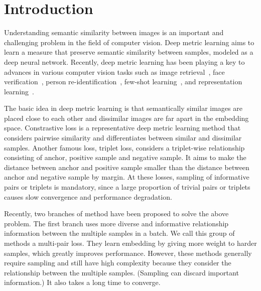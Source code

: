 \documentclass[10pt,twocolumn,letterpaper]{article}
\newcommand{\suha}[1]{{\color{brown}{#1}}}
\begin{document}
\section{Introduction}
\label{sec:intro}
Understanding semantic similarity between images is an important and challenging problem in the field of computer vision. Deep metric learning aims to learn a measure that preserve semantic similarity between samples, modeled as a deep neural network. \suha{(talk about deep metric learning at the end of this paragraph or move this sentence to the enxt paragraph---deep metric learning = deep neural net for feature extraction learned by metric learning losses, so losses are important.)}
Recently, deep metric learning has been playing a key to advances in various computer vision tasks such as image retrieval~\cite{movshovitz2017no, songCVPR16, Sohn_nips2016, kim2019deep}, face verification~\cite{Schroff2015, liu2017sphereface}, person re-identification~\cite{Chen_2017_CVPR,xiao2017joint}, few-shot learning~\cite{snell2017prototypical, sung2018learning, Qiao_2019_ICCV}, and representation learning~\cite{kim2019deep,Wang2015}. \suha{(add more examples of few/zero-shot learning using metric learning if possible. any iccv 2019 papers to be cited? \eg, patch-representation learning using soft-margin triplet loss.)}





The basic idea in deep metric learning is that semantically similar images are placed close to each other and dissimilar images are far apart in the embedding space.
Constrastive loss is a representative deep metric learning method that considers pairwise similarity and differentiates between similar and dissimilar samples. Another famous loss, triplet loss, considers a triplet-wise relationship consisting of anchor, positive sample and negative sample. It aims to make the distance between anchor and positive sample smaller than the distance between anchor and negative sample by margin. At these losses, sampling of informative pairs or triplets is mandatory, since a large proportion of trivial pairs or triplets causes slow convergence and performance degradation.

Recently, two branches of method have been proposed to solve the above problem. The first branch uses more diverse and informative relationship information between the multiple samples in a batch. We call this group of methods a multi-pair loss. \cite{songCVPR16, Sohn_nips2016, wang2019multi, wang2019ranked, Yu_2019_ICCV} \suha{(cite relevant papers.)} They learn embedding by giving more weight to harder samples, which greatly improves performance. However, these methods generally require sampling and still have high complexity because they consider the relationship between the multiple samples. (Sampling can discard important information.) It also takes a long time to converge. \suha{(the difference between contrastic/triplet losses and the multi-pair loss is not clearly presented. also, what kinds of losses are included in the category of multi-pair loss? definition of the multi-pair loss is not given clear; it is hard to guess what kind of loss could be a member of this category.)}
\end{document}
